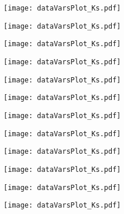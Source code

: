 \begin{figure}[H]
\ContinuedFloat
\begin{subfigure}{0.5\linewidth}
	\texttt{[image: dataVarsPlot\_Ks.pdf]}
\end{subfigure}
\begin{subfigure}{0.5\linewidth}
	\texttt{[image: dataVarsPlot\_Ks.pdf]}
\end{subfigure}
\begin{subfigure}{0.5\linewidth}
	\texttt{[image: dataVarsPlot\_Ks.pdf]}
\end{subfigure}
\begin{subfigure}{0.5\linewidth}
\texttt{[image: dataVarsPlot\_Ks.pdf]}
\end{subfigure}
\end{figure}

\begin{figure}[H]
\ContinuedFloat
\begin{subfigure}{0.5\linewidth}
	\texttt{[image: dataVarsPlot\_Ks.pdf]}
\end{subfigure}
\begin{subfigure}{0.5\linewidth}
	\texttt{[image: dataVarsPlot\_Ks.pdf]}
\end{subfigure}
\begin{subfigure}{0.5\linewidth}
\texttt{[image: dataVarsPlot\_Ks.pdf]}
\end{subfigure}
\begin{subfigure}{0.5\linewidth}
\texttt{[image: dataVarsPlot\_Ks.pdf]}
\end{subfigure}
\end{figure}

\begin{figure}[H]
	\ContinuedFloat
	\begin{subfigure}{0.5\linewidth}
		\texttt{[image: dataVarsPlot\_Ks.pdf]}
	\end{subfigure}
	\begin{subfigure}{0.5\linewidth}
		\texttt{[image: dataVarsPlot\_Ks.pdf]}
	\end{subfigure}
\begin{subfigure}{0.5\linewidth}
\texttt{[image: dataVarsPlot\_Ks.pdf]}
\end{subfigure}
\begin{subfigure}{0.5\linewidth}
\texttt{[image: dataVarsPlot\_Ks.pdf]}
\end{subfigure}

\end{figure}

